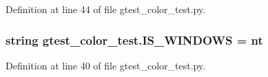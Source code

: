 Definition at line 44 of file gtest\+\_\+color\+\_\+test.\+py.

\subsubsection[{\texorpdfstring{I\+S\+\_\+\+W\+I\+N\+D\+O\+WS}{IS_WINDOWS}}]{\setlength{\rightskip}{0pt plus 5cm}string gtest\+\_\+color\+\_\+test.\+I\+S\+\_\+\+W\+I\+N\+D\+O\+WS = \textquotesingle{}nt\textquotesingle{}}\hypertarget{namespacegtest__color__test_a0d4451a99f88105308f0842eb3ec2938}{}\label{namespacegtest__color__test_a0d4451a99f88105308f0842eb3ec2938}


Definition at line 40 of file gtest\+\_\+color\+\_\+test.\+py.

